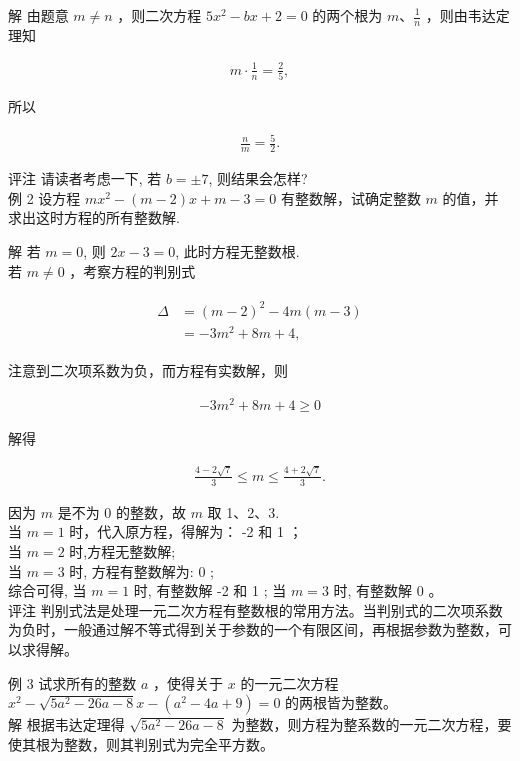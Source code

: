 \documentclass[10pt]{article}
\begin{document}
解 由题意 $m \neq n$ ，则二次方程 $5 x^{2}-b x+2=0$ 的两个根为 $m 、 \frac{1}{n}$ ，则由韦达定理知

\begin{align*}
m \cdot \frac{1}{n}=\frac{2}{5},
\end{align*}

所以

\begin{align*}
\frac{n}{m}=\frac{5}{2} .
\end{align*}

评注 请读者考虑一下, 若 $b= \pm 7$, 则结果会怎样?\\
例 2 设方程 $m x^{2}-(m-2) x+m-3=0$ 有整数解，试确定整数 $m$ 的值，并求出这时方程的所有整数解.

解 若 $m=0$, 则 $2 x-3=0$, 此时方程无整数根.\\
若 $m \neq 0$ ，考察方程的判别式

\begin{align*}
\begin{aligned}
\Delta & =(m-2)^{2}-4 m(m-3) \\
& =-3 m^{2}+8 m+4,
\end{aligned}
\end{align*}

注意到二次项系数为负，而方程有实数解，则

\begin{align*}
-3 m^{2}+8 m+4 \geqslant 0
\end{align*}

解得

\begin{align*}
\frac{4-2 \sqrt{7}}{3} \leqslant m \leqslant \frac{4+2 \sqrt{7}}{3} .
\end{align*}

因为 $m$ 是不为 0 的整数，故 $m$ 取 1、2、3.\\
当 $m=1$ 时，代入原方程，得解为： -2 和 1 ；\\
当 $m=2$ 时,方程无整数解;\\
当 $m=3$ 时, 方程有整数解为: 0 ;\\
综合可得, 当 $m=1$ 时, 有整数解 -2 和 1 ; 当 $m=3$ 时, 有整数解 0 。\\
评注 判别式法是处理一元二次方程有整数根的常用方法。当判别式的二次项系数为负时，一般通过解不等式得到关于参数的一个有限区间，再根据参数为整数，可以求得解。

例 3 试求所有的整数 $a$ ，使得关于 $x$ 的一元二次方程\\
$x^{2}-\sqrt{5 a^{2}-26 a-8} x-\left(a^{2}-4 a+9\right)=0$ 的两根皆为整数。\\
解 根据韦达定理得 $\sqrt{5 a^{2}-26 a-8}$ 为整数，则方程为整系数的一元二次方程，要使其根为整数，则其判别式为完全平方数。
\end{document}
